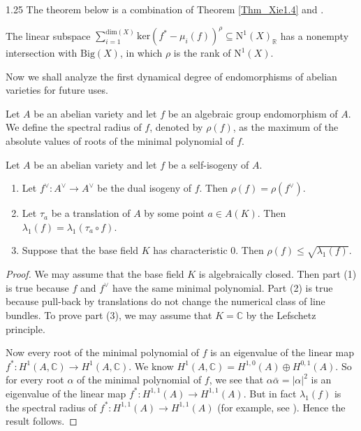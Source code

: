 \documentclass[12pt]{amsart}
\begin{document}
\begin{spacing}{1.25}
The theorem below is a combination of Theorem \ref{Thm_Xie1.4} and \cite[Theorem 1.3]{xie25}.

\begin{theorem}\label{Thm_Xie1.3}
The linear subspace $\sum\limits_{i=1}^{\mathrm{dim}(X)}\mathrm{ker}(f^*-\mu_i(f))^{\rho}\subseteq\mathrm{N}^1(X)_{\mathbb{R}}$ has a nonempty intersection with $\mathrm{Big}(X)$, in which $\rho$ is the rank of $\mathrm{N}^1(X)$.
\end{theorem}

Now we shall analyze the first dynamical degree of endomorphisms of abelian varieties for future uses.

\begin{definition}
Let $A$ be an abelian variety and let $f$ be an algebraic group endomorphism of $A$. We define the spectral radius of $f$, denoted by $\rho(f)$, as the maximum of the absolute values of roots of the minimal polynomial of $f$.
\end{definition}

\begin{proposition}\label{Prop_abel}
Let $A$ be an abelian variety and let $f$ be a self-isogeny of $A$.
\begin{enumerate}
\item
Let $f^{\vee}:A^{\vee}\rightarrow A^{\vee}$ be the dual isogeny of $f$. Then $\rho(f)=\rho(f^{\vee})$.
\item
Let $\tau_a$ be a translation of $A$ by some point $a\in A(K)$. Then $\lambda_1(f)=\lambda_1(\tau_a\circ f)$.
\item
Suppose that the base field $K$ has characteristic 0. Then $\rho(f)\leq\sqrt{\lambda_1(f)}$.
\end{enumerate}
\end{proposition}

\begin{proof}
We may assume that the base field $K$ is algebraically closed. Then part (1) is true because $f$ and $f^{\vee}$ have the same minimal polynomial. Part (2) is true because pull-back by translations do not change the numerical class of line bundles. To prove part (3), we may assume that $K=\mathbb{C}$ by the Lefschetz principle.

Now every root of the minimal polynomial of $f$ is an eigenvalue of the linear map $f^*:H^{1}(A,\mathbb{C})\rightarrow H^{1}(A,\mathbb{C})$. We know $H^{1}(A,\mathbb{C})=H^{1,0}(A)\oplus H^{0,1}(A)$. So for every root $\alpha$ of the minimal polynomial of $f$, we see that $\alpha\bar{\alpha}=|\alpha|^2$ is an eigenvalue of the linear map $f^*:H^{1,1}(A)\rightarrow H^{1,1}(A)$. But in fact $\lambda_1(f)$ is the spectral radius of $f^*:H^{1,1}(A)\rightarrow H^{1,1}(A)$ (for example, see \cite[top of p. 72]{Tru25}). Hence the result follows.
\end{proof}






\end{spacing}
\end{document}
